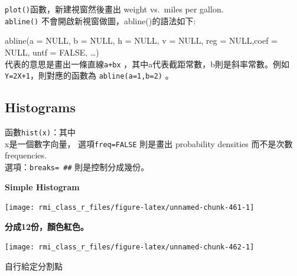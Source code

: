 \documentclass[]{book}
\newenvironment{Shaded}{\begin{snugshade}}{\end{snugshade}}
\newcommand{\DataTypeTok}[1]{\textcolor[rgb]{0.13,0.29,0.53}{#1}}
\newcommand{\DecValTok}[1]{\textcolor[rgb]{0.00,0.00,0.81}{#1}}
\newcommand{\KeywordTok}[1]{\textcolor[rgb]{0.13,0.29,0.53}{\textbf{#1}}}
\newcommand{\NormalTok}[1]{#1}
\newcommand{\OperatorTok}[1]{\textcolor[rgb]{0.81,0.36,0.00}{\textbf{#1}}}
\newcommand{\StringTok}[1]{\textcolor[rgb]{0.31,0.60,0.02}{#1}}
\theoremstyle{definition}
\theoremstyle{definition}
\theoremstyle{definition}
\theoremstyle{remark}
\begin{document}
\texttt{plot()}函數，新建視窗然後畫出 weight vs.~miles per gallon.\\
\texttt{abline()} 不會開啟新視窗做圖，abline()的語法如下:

abline(a = NULL, b = NULL, h = NULL, v = NULL, reg = NULL,coef = NULL,
untf = FALSE, \ldots{})\\
代表的意思是畫出一條直線\texttt{a+bx}
，其中a代表截距常數，b則是斜率常數。例如\\
\texttt{Y=2X+1}，則對應的函數為 \texttt{abline(a=1,b=2)} 。

\hypertarget{histograms}{%
\subsection{Histograms}\label{histograms}}

函數\texttt{hist(x)}：其中\\
x是一個數字向量， 選項\texttt{freq=FALSE} 則是畫出 probability densities
而不是次數 frequencies.\\
選項：\texttt{breaks=\ \#\#} 則是控制分成幾份。

\textbf{Simple Histogram}

\begin{Shaded}
\end{Shaded}

\begin{center}\texttt{[image: rmi\_class\_r\_files/figure-latex/unnamed-chunk-461-1]} \end{center}

\textbf{分成12份，顏色紅色。}

\begin{Shaded}
\end{Shaded}

\begin{center}\texttt{[image: rmi\_class\_r\_files/figure-latex/unnamed-chunk-462-1]} \end{center}

自行給定分割點

\begin{Shaded}
\end{Shaded}
\end{document}
